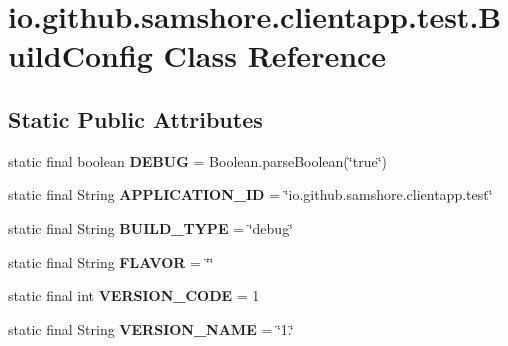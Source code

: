 \hypertarget{classio_1_1github_1_1samshore_1_1clientapp_1_1test_1_1_build_config}{}\section{io.\+github.\+samshore.\+clientapp.\+test.\+Build\+Config Class Reference}
\label{classio_1_1github_1_1samshore_1_1clientapp_1_1test_1_1_build_config}
\subsection*{Static Public Attributes}
\begin{DoxyCompactItemize}
\item 
static final boolean {\bfseries D\+E\+B\+UG} = Boolean.\+parse\+Boolean(\char`\"{}true\char`\"{})\hypertarget{classio_1_1github_1_1samshore_1_1clientapp_1_1test_1_1_build_config_a5eb8217951dc63eeb07b39a3cccb56eb}{}\label{classio_1_1github_1_1samshore_1_1clientapp_1_1test_1_1_build_config_a5eb8217951dc63eeb07b39a3cccb56eb}

\item 
static final String {\bfseries A\+P\+P\+L\+I\+C\+A\+T\+I\+O\+N\+\_\+\+ID} = \char`\"{}io.\+github.\+samshore.\+clientapp.\+test\char`\"{}\hypertarget{classio_1_1github_1_1samshore_1_1clientapp_1_1test_1_1_build_config_ae798e12ed2e750037f4030f74a3abce2}{}\label{classio_1_1github_1_1samshore_1_1clientapp_1_1test_1_1_build_config_ae798e12ed2e750037f4030f74a3abce2}

\item 
static final String {\bfseries B\+U\+I\+L\+D\+\_\+\+T\+Y\+PE} = \char`\"{}debug\char`\"{}\hypertarget{classio_1_1github_1_1samshore_1_1clientapp_1_1test_1_1_build_config_a2d9c2243494dca9eb531b28ab2913564}{}\label{classio_1_1github_1_1samshore_1_1clientapp_1_1test_1_1_build_config_a2d9c2243494dca9eb531b28ab2913564}

\item 
static final String {\bfseries F\+L\+A\+V\+OR} = \char`\"{}\char`\"{}\hypertarget{classio_1_1github_1_1samshore_1_1clientapp_1_1test_1_1_build_config_af5e46e2dd446ca0f4ce0f7c4fedf71c0}{}\label{classio_1_1github_1_1samshore_1_1clientapp_1_1test_1_1_build_config_af5e46e2dd446ca0f4ce0f7c4fedf71c0}

\item 
static final int {\bfseries V\+E\+R\+S\+I\+O\+N\+\_\+\+C\+O\+DE} = 1\hypertarget{classio_1_1github_1_1samshore_1_1clientapp_1_1test_1_1_build_config_aeef1852bd07ffba1f50a17437119ea8d}{}\label{classio_1_1github_1_1samshore_1_1clientapp_1_1test_1_1_build_config_aeef1852bd07ffba1f50a17437119ea8d}

\item 
static final String {\bfseries V\+E\+R\+S\+I\+O\+N\+\_\+\+N\+A\+ME} = \char`\"{}1.\char`\"{}\hypertarget{classio_1_1github_1_1samshore_1_1clientapp_1_1test_1_1_build_config_a994e4734b6d3c46645616cb18d1b9e95}{}\label{classio_1_1github_1_1samshore_1_1clientapp_1_1test_1_1_build_config_a994e4734b6d3c46645616cb18d1b9e95}

\end{DoxyCompactItemize}


